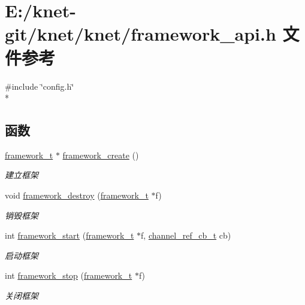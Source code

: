 \hypertarget{a00052}{}\section{E\+:/knet-\/git/knet/knet/framework\+\_\+api.h 文件参考}
\label{a00052}
{\ttfamily \#include \char`\"{}config.\+h\char`\"{}}\\*
\subsection*{函数}
\begin{DoxyCompactItemize}
\item 
\hyperlink{a00047_a6149d769f6f07ed14a40a271c95d8463_a6149d769f6f07ed14a40a271c95d8463}{framework\+\_\+t} $\ast$ \hyperlink{a00093_ga90b29a0c500209cb9b37437a32188a40_ga90b29a0c500209cb9b37437a32188a40}{framework\+\_\+create} ()
\begin{DoxyCompactList}\small\item\em 建立框架 \end{DoxyCompactList}\item 
void \hyperlink{a00093_gad1b6cb17014bfc515f8861bad3198e22_gad1b6cb17014bfc515f8861bad3198e22}{framework\+\_\+destroy} (\hyperlink{a00047_a6149d769f6f07ed14a40a271c95d8463_a6149d769f6f07ed14a40a271c95d8463}{framework\+\_\+t} $\ast$f)
\begin{DoxyCompactList}\small\item\em 销毁框架 \end{DoxyCompactList}\item 
int \hyperlink{a00093_ga7579f69fe8d0ec6887e4594f52cbb883_ga7579f69fe8d0ec6887e4594f52cbb883}{framework\+\_\+start} (\hyperlink{a00047_a6149d769f6f07ed14a40a271c95d8463_a6149d769f6f07ed14a40a271c95d8463}{framework\+\_\+t} $\ast$f, \hyperlink{a00047_ae296ec4d1ce108960de8dcc423956a1d_ae296ec4d1ce108960de8dcc423956a1d}{channel\+\_\+ref\+\_\+cb\+\_\+t} cb)
\begin{DoxyCompactList}\small\item\em 启动框架 \end{DoxyCompactList}\item 
int \hyperlink{a00093_ga429be76d09278d6170f1b519f4dbb689_ga429be76d09278d6170f1b519f4dbb689}{framework\+\_\+stop} (\hyperlink{a00047_a6149d769f6f07ed14a40a271c95d8463_a6149d769f6f07ed14a40a271c95d8463}{framework\+\_\+t} $\ast$f)
\begin{DoxyCompactList}\small\item\em 关闭框架 \end{DoxyCompactList}\item 

\end{DoxyCompactItemize}
